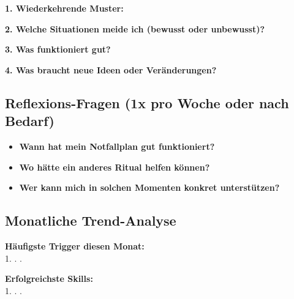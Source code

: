 \begin{tcolorbox}[colback=ctmmPurple!5!white,colframe=ctmmPurple,title=\textcolor{white}{\textbf{Reflexionsfragen für diese Woche}}]

\textbf{1. Wiederkehrende Muster:}\\

\textbf{2. Welche Situationen meide ich (bewusst oder unbewusst)?}\\

\textbf{3. Was funktioniert gut?}\\

\textbf{4. Was braucht neue Ideen oder Veränderungen?}\\

\end{tcolorbox}

\subsection*{\textcolor{ctmmGreen}{Reflexions-Fragen (1x pro Woche oder nach Bedarf)}}

\begin{itemize}
  \item \textbf{Wann hat mein Notfallplan gut funktioniert?}\\
  
  \item \textbf{Wo hätte ein anderes Ritual helfen können?}\\
  
  \item \textbf{Wer kann mich in solchen Momenten konkret unterstützen?}\\
\end{itemize}

\subsection*{\textcolor{ctmmOrange}{Monatliche Trend-Analyse}}

\textbf{Häufigste Trigger diesen Monat:}\\
1.  .  . 

\textbf{Erfolgreichste Skills:}\\
1.  .  . 

